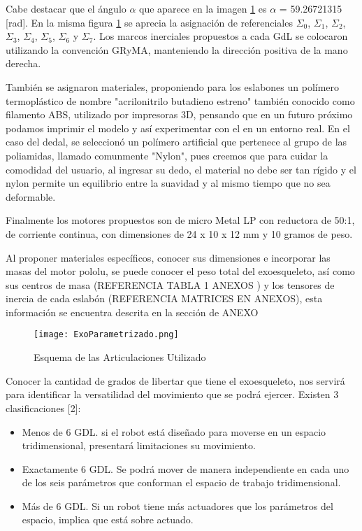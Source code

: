 Cabe destacar que el ángulo $\alpha$ que aparece en la imagen \ref{fig:ExoPara} es 
$\alpha$ = 59.26721315 [rad]. En la misma figura \ref{fig:ExoPara} se aprecia la asignación 
de referenciales $\Sigma_0$, $\Sigma_1$, $\Sigma_2$, $\Sigma_3$, $\Sigma_4$, $\Sigma_5$,  
$\Sigma_6$ y $\Sigma_7$. Los marcos inerciales propuestos a cada GdL se colocaron utilizando 
la convención GRyMA, manteniendo la dirección positiva de la mano derecha.

También se asignaron materiales, proponiendo para los eslabones un polímero termoplástico de 
nombre "acrilonitrilo butadieno estreno" también conocido como filamento ABS, utilizado por 
impresoras 3D, pensando que en un futuro próximo podamos imprimir el modelo y así experimentar 
con el en un entorno real. En el caso del dedal, se seleccionó un polímero artificial que 
pertenece al grupo de las poliamidas, llamado comunmente "Nylon", pues creemos que para cuidar 
la comodidad del usuario, al ingresar su dedo, el material no debe ser tan rígido y el nylon 
permite un equilibrio entre la suavidad y al mismo tiempo que no sea deformable.

Finalmente los motores propuestos son de micro Metal LP con reductora de 50:1, de corriente 
continua, con dimensiones de 24 x 10 x 12 mm y 10 gramos de peso. 

Al proponer materiales específicos, conocer sus dimensiones e incorporar las masas del motor 
pololu, se puede conocer el peso total del exoesqueleto, así como sus centros de masa 
(REFERENCIA TABLA 1 ANEXOS ) y los tensores de inercia de cada eslabón 
(REFERENCIA MATRICES EN ANEXOS), esta información se encuentra descrita en la sección de ANEXO  

\begin{figure}[H]
    \centering
    \texttt{[image: ExoParametrizado.png]}
    \caption{Esquema de las Articulaciones Utilizado}
    \label{fig:ExoPara}
\end{figure}

Conocer la cantidad de grados de libertar que tiene el exoesqueleto, nos servirá para identificar 
la versatilidad del movimiento que se podrá ejercer. Existen 3 clasificaciones [2]:

\begin{itemize}
    \item Menos de 6 GDL.  si el robot está diseñado para moverse en un espacio tridimensional, presentará  limitaciones su movimiento. 
    \item Exactamente 6 GDL. Se podrá mover de manera independiente en cada uno de los seis parámetros que conforman el espacio de trabajo tridimensional.
    \item Más de 6 GDL. Si un robot tiene más actuadores que los parámetros del espacio, implica que está sobre actuado.
\end{itemize}